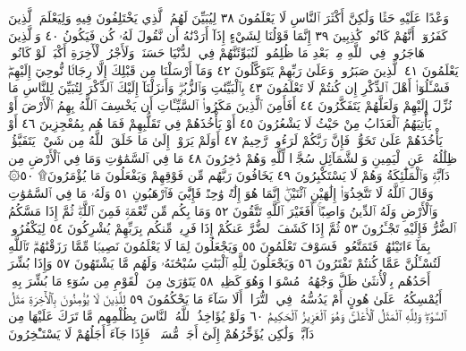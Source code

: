 وَعْدًا عَلَيْهِ حَقࣰّا وَلَٰكِنَّ أَكْثَرَ ٱلنَّاسِ لَا يَعْلَمُونَ ٣٨
لِيُبَيِّنَ لَهُمُ ٱلَّذِي يَخْتَلِفُونَ فِيهِ وَلِيَعْلَمَ ٱلَّذِينَ كَفَرُوٓا۟
أَنَّهُمْ كَانُوا۟ كَٰذِبِينَ ٣٩ إِنَّمَا قَوْلُنَا لِشَيْءٍ إِذَآ أَرَدْنَٰهُ أَن نَّقُولَ
لَهُۥ كُن فَيَكُونُ ٤٠ وَٱلَّذِينَ هَاجَرُوا۟ فِي ٱللَّهِ مِنۢ بَعْدِ مَا ظُلِمُوا۟
لَنُبَوِّئَنَّهُمْ فِي ٱلدُّنْيَا حَسَنَةࣰۖ وَلَأَجْرُ ٱلْأٓخِرَةِ أَكْبَرُۚ لَوْ كَانُوا۟
يَعْلَمُونَ ٤١ ٱلَّذِينَ صَبَرُوا۟ وَعَلَىٰ رَبِّهِمْ يَتَوَكَّلُونَ ٤٢
وَمَآ أَرْسَلْنَا مِن قَبْلِكَ إِلَّا رِجَالࣰا نُّوحِيٓ إِلَيْهِمْۖ فَسْـَٔلُوٓا۟ أَهْلَ
ٱلذِّكْرِ إِن كُنتُمْ لَا تَعْلَمُونَ ٤٣ بِٱلْبَيِّنَٰتِ وَٱلزُّبُرِۗ وَأَنزَلْنَآ إِلَيْكَ
ٱلذِّكْرَ لِتُبَيِّنَ لِلنَّاسِ مَا نُزِّلَ إِلَيْهِمْ وَلَعَلَّهُمْ يَتَفَكَّرُونَ ٤٤
أَفَأَمِنَ ٱلَّذِينَ مَكَرُوا۟ ٱلسَّيِّـَٔاتِ أَن يَخْسِفَ ٱللَّهُ بِهِمُ ٱلْأَرْضَ
أَوْ يَأْتِيَهُمُ ٱلْعَذَابُ مِنْ حَيْثُ لَا يَشْعُرُونَ ٤٥ أَوْ يَأْخُذَهُمْ
فِي تَقَلُّبِهِمْ فَمَا هُم بِمُعْجِزِينَ ٤٦ أَوْ يَأْخُذَهُمْ عَلَىٰ تَخَوُّفࣲ فَإِنَّ
رَبَّكُمْ لَرَءُوفࣱ رَّحِيمٌ ٤٧ أَوَلَمْ يَرَوْا۟ إِلَىٰ مَا خَلَقَ ٱللَّهُ مِن شَيْءࣲ
يَتَفَيَّؤُا۟ ظِلَٰلُهُۥ عَنِ ٱلْيَمِينِ وَٱلشَّمَآئِلِ سُجَّدࣰا لِّلَّهِ وَهُمْ دَٰخِرُونَ ٤٨
 مَا فِي ٱلسَّمَٰوَٰتِ وَمَا فِي ٱلْأَرْضِ مِن دَآبَّةࣲ
وَٱلْمَلَٰٓئِكَةُ وَهُمْ لَا يَسْتَكْبِرُونَ ٤٩ يَخَافُونَ رَبَّهُم مِّن فَوْقِهِمْ
وَيَفْعَلُونَ مَا يُؤْمَرُونَ۩ ٥٠۞ وَقَالَ ٱللَّهُ لَا تَتَّخِذُوٓا۟ إِلَٰهَيْنِ
ٱثْنَيْنِۖ إِنَّمَا هُوَ إِلَٰهࣱ وَٰحِدࣱ فَإِيَّٰيَ فَٱرْهَبُونِ ٥١ وَلَهُۥ مَا فِي ٱلسَّمَٰوَٰتِ
وَٱلْأَرْضِ وَلَهُ ٱلدِّينُ وَاصِبًاۚ أَفَغَيْرَ ٱللَّهِ تَتَّقُونَ ٥٢ وَمَا بِكُم مِّن
نِّعْمَةࣲ فَمِنَ ٱللَّهِۖ ثُمَّ إِذَا مَسَّكُمُ ٱلضُّرُّ فَإِلَيْهِ تَجْـَٔرُونَ ٥٣ ثُمَّ إِذَا
كَشَفَ ٱلضُّرَّ عَنكُمْ إِذَا فَرِيقࣱ مِّنكُم بِرَبِّهِمْ يُشْرِكُونَ ٥٤
لِيَكْفُرُوا۟ بِمَآ ءَاتَيْنَٰهُمْۚ فَتَمَتَّعُوا۟ فَسَوْفَ تَعْلَمُونَ ٥٥ وَيَجْعَلُونَ
لِمَا لَا يَعْلَمُونَ نَصِيبࣰا مِّمَّا رَزَقْنَٰهُمْۗ تَٱللَّهِ لَتُسْـَٔلُنَّ عَمَّا كُنتُمْ
تَفْتَرُونَ ٥٦ وَيَجْعَلُونَ لِلَّهِ ٱلْبَنَٰتِ سُبْحَٰنَهُۥ وَلَهُم مَّا يَشْتَهُونَ ٥٧
وَإِذَا بُشِّرَ أَحَدُهُم بِٱلْأُنثَىٰ ظَلَّ وَجْهُهُۥ مُسْوَدࣰّا وَهُوَ كَظِيمࣱ ٥٨
يَتَوَٰرَىٰ مِنَ ٱلْقَوْمِ مِن سُوٓءِ مَا بُشِّرَ بِهِۦٓۚ أَيُمْسِكُهُۥ عَلَىٰ هُونٍ
أَمْ يَدُسُّهُۥ فِي ٱلتُّرَابِۗ أَلَا سَآءَ مَا يَحْكُمُونَ ٥٩ لِلَّذِينَ لَا يُؤْمِنُونَ
بِٱلْأٓخِرَةِ مَثَلُ ٱلسَّوْءِۖ وَلِلَّهِ ٱلْمَثَلُ ٱلْأَعْلَىٰۚ وَهُوَ ٱلْعَزِيزُ ٱلْحَكِيمُ ٦٠
وَلَوْ يُؤَاخِذُ ٱللَّهُ ٱلنَّاسَ بِظُلْمِهِم مَّا تَرَكَ عَلَيْهَا مِن دَآبَّةࣲ
وَلَٰكِن يُؤَخِّرُهُمْ إِلَىٰٓ أَجَلࣲ مُّسَمࣰّىۖ فَإِذَا جَآءَ أَجَلُهُمْ لَا يَسْتَـْٔخِرُونَ
